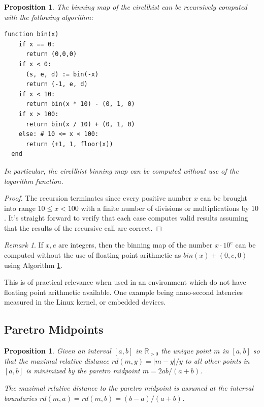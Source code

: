 \documentclass{article}
\theoremstyle{plain}
\newtheorem{proposition}[definition]{Proposition}
\theoremstyle{remark}
\newtheorem{remark}[definition]{Remark}
\newcommand{\IR}{\mathbb{R}}
\begin{document}
\begin{proposition} \label{prop:rec}
  The binning map of the circllhist can be recursively computed with the following algorithm:

\begin{BVerbatim}[fontfamily=tt]
  function bin(x)
    if x == 0:
      return (0,0,0)
    if x < 0:
      (s, e, d) := bin(-x)
      return (-1, e, d)
    if x < 10:
      return bin(x * 10) - (0, 1, 0)
    if x > 100:
      return bin(x / 10) + (0, 1, 0)
    else: # 10 <= x < 100:
      return (+1, 1, floor(x))
  end
\end{BVerbatim}

In particular, the circllhist binning map can be computed without use of the logarithm function.
\end{proposition}

\begin{proof}
  The recursion terminates since every positive number $x$ can be brought into range $10 \leq x <
  100$ with a finite number of divisions or multiplications by $10$.  It's straight forward to
  verify that each case computes valid results assuming that the results of the recursive call are
  correct.
\end{proof}

\begin{remark}
  If $x,e$ are integers, then the binning map of the number $x \cdot 10^{e}$ can be computed without
  the use of floating point arithmetic as $bin(x) + (0,e,0)$ using Algorithm \ref{prop:rec}.

  This is of practical relevance when used in an environment which do not have floating
  point arithmetic available. One example being nano-second latencies measured in the Linux kernel,
  or embedded devices.
\end{remark}

\subsection{Paretro Midpoints}

\begin{proposition} \label{prop:pdist}
  Given an interval $[a,b]$ in $\IR_{>0}$ the unique point $m$ in $[a,b]$ so that the maximal
  relative distance $rd(m, y) = |m-y|/y$ to all other points in $[a,b]$ is minimized
  by the paretro midpoint
  $m = 2ab / (a + b)$.

  The maximal relative distance to the paretro midpoint is assumed at the interval boundaries
  $rd(m,a) = rd(m,b) = (b - a) / (a + b)$.
\end{proposition}
\end{document}
